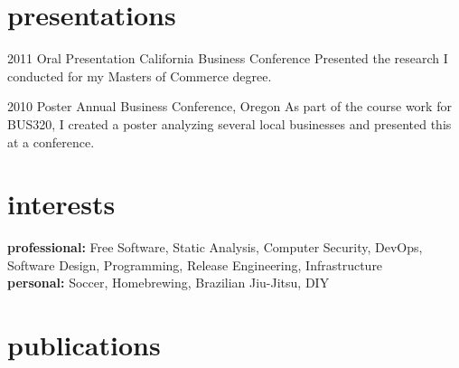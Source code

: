 \documentclass[]{friggeri-cv} %
\begin{document}

\section{presentations}

\begin{entrylist}


\entry
{2011}
{Oral Presentation}
{California Business Conference}
{Presented the research I conducted for my Masters of Commerce degree.}


\entry
{2010}
{Poster}
{Annual Business Conference, Oregon}
{As part of the course work for BUS320, I created a poster analyzing several local businesses and presented this at a conference.}


\end{entrylist}


\section{interests}

\textbf{professional:} Free Software, Static Analysis, Computer Security, DevOps, Software Design, Programming, Release Engineering, Infrastructure\\
\textbf{personal:} Soccer, Homebrewing, Brazilian Jiu-Jitsu, DIY


\section{publications}

\end{document}
